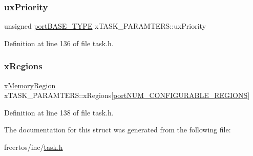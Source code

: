 \subsubsection{\texorpdfstring{ux\+Priority}{uxPriority}}
{\footnotesize\ttfamily unsigned \hyperlink{portmacro_8h_a1ebe82d24d764ae4e352f7c3a9f92c01}{port\+B\+A\+S\+E\+\_\+\+T\+Y\+PE} x\+T\+A\+S\+K\+\_\+\+P\+A\+R\+A\+M\+T\+E\+R\+S\+::ux\+Priority}



Definition at line 136 of file task.\+h.

\mbox{\label{structxTASK__PARAMTERS_a3369446f636e3d74d46d174590e244f0}} 
\subsubsection{\texorpdfstring{x\+Regions}{xRegions}}
{\footnotesize\ttfamily \hyperlink{task_8h_a0327ca449bbeb07a6f76456943c787dc}{x\+Memory\+Region} x\+T\+A\+S\+K\+\_\+\+P\+A\+R\+A\+M\+T\+E\+R\+S\+::x\+Regions\mbox{[}\hyperlink{portable_8h_aca7e1a8a568a38b74cc9db10c8efebda}{port\+N\+U\+M\+\_\+\+C\+O\+N\+F\+I\+G\+U\+R\+A\+B\+L\+E\+\_\+\+R\+E\+G\+I\+O\+NS}\mbox{]}}



Definition at line 138 of file task.\+h.



The documentation for this struct was generated from the following file\+:\begin{DoxyCompactItemize}
\item 
freertos/inc/\hyperlink{task_8h}{task.\+h}\end{DoxyCompactItemize}
